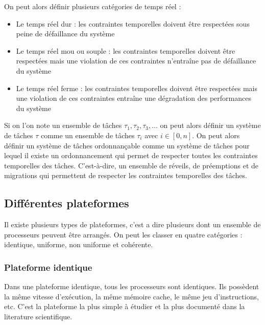 On peut alors définir plusieurs catégories de temps réel :
\begin{itemize}
    \item Le temps réel dur : les contraintes temporelles doivent être respectées sous peine de défaillance du système
    \item Le temps réel mou ou souple : les contraintes temporelles doivent être respectées mais une violation de ces contraintes n'entraîne pas de défaillance du système
    \item Le temps réel ferme : les contraintes temporelles doivent être respectées mais une violation de ces contraintes entraîne une dégradation des performances du système
\end{itemize}


Si on l'on note un ensemble de tâches $\tau_1, \tau_2, \tau_3, ...$ on peut alors définir un système de tâches $\tau$ comme un ensemble de tâches $\tau_i$ avec $i \in \left[ 0,n \right]$. On peut alors définir un système de tâches ordonnançable comme un système de tâches pour lequel il existe un ordonnancement qui permet de respecter toutes les contraintes temporelles des tâches. C'est-à-dire, un ensemble de réveils, de préemptions et de migrations qui permettent de respecter les contraintes temporelles des tâches.




\subsection{Différentes plateformes}

Il existe plusieurs types de plateformes, c'est a dire plusieurs dont un ensemble de processeurs peuvent être arrangés. On peut les classer en quatre catégories : identique, uniforme, non uniforme et cohérente.
\subsubsection{Plateforme identique}
Dans une plateforme identique, tous les processeurs sont identiques. Ils possèdent la même vitesse d'exécution, la même mémoire cache, le même jeu d'instructions, etc. C'est la plateforme la plus simple à étudier et la plus documenté dans la literature scientifique. 

